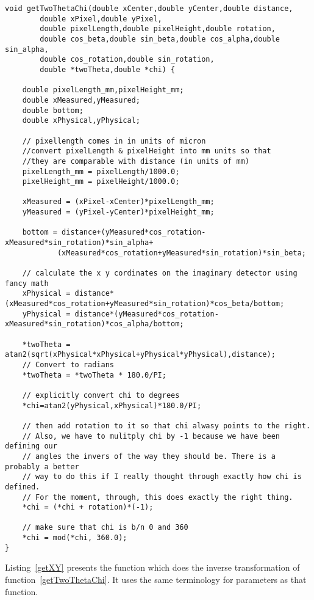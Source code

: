 \begin{lstlisting}[caption={The Code to convert pixel coordinates on a real detector into $(Q,\chi)$ coordinates},label=getTwoThetaChi]
void getTwoThetaChi(double xCenter,double yCenter,double distance,
        double xPixel,double yPixel,
        double pixelLength,double pixelHeight,double rotation,
        double cos_beta,double sin_beta,double cos_alpha,double sin_alpha,
        double cos_rotation,double sin_rotation,
        double *twoTheta,double *chi) {

    double pixelLength_mm,pixelHeight_mm;
    double xMeasured,yMeasured;
    double bottom;
    double xPhysical,yPhysical;

    // pixellength comes in in units of micron
    //convert pixelLength & pixelHeight into mm units so that
    //they are comparable with distance (in units of mm)
    pixelLength_mm = pixelLength/1000.0;
    pixelHeight_mm = pixelHeight/1000.0;
    
    xMeasured = (xPixel-xCenter)*pixelLength_mm;
    yMeasured = (yPixel-yCenter)*pixelHeight_mm;

    bottom = distance+(yMeasured*cos_rotation-xMeasured*sin_rotation)*sin_alpha+
            (xMeasured*cos_rotation+yMeasured*sin_rotation)*sin_beta;
        
    // calculate the x y cordinates on the imaginary detector using fancy math
    xPhysical = distance*(xMeasured*cos_rotation+yMeasured*sin_rotation)*cos_beta/bottom;
    yPhysical = distance*(yMeasured*cos_rotation-xMeasured*sin_rotation)*cos_alpha/bottom;

    *twoTheta = atan2(sqrt(xPhysical*xPhysical+yPhysical*yPhysical),distance);
    // Convert to radians
    *twoTheta = *twoTheta * 180.0/PI;

    // explicitly convert chi to degrees
    *chi=atan2(yPhysical,xPhysical)*180.0/PI;
    
    // then add rotation to it so that chi alwasy points to the right.
    // Also, we have to mulitply chi by -1 because we have been defining our
    // angles the invers of the way they should be. There is a probably a better
    // way to do this if I really thought through exactly how chi is defined.
    // For the moment, through, this does exactly the right thing.
    *chi = (*chi + rotation)*(-1);

    // make sure that chi is b/n 0 and 360
    *chi = mod(*chi, 360.0);
}
\end{lstlisting}
Listing~\ref{getXY} presents the function  
which does the inverse transformation of 
function~\ref{getTwoThetaChi}. It uses the same
terminology for parameters as that function.

